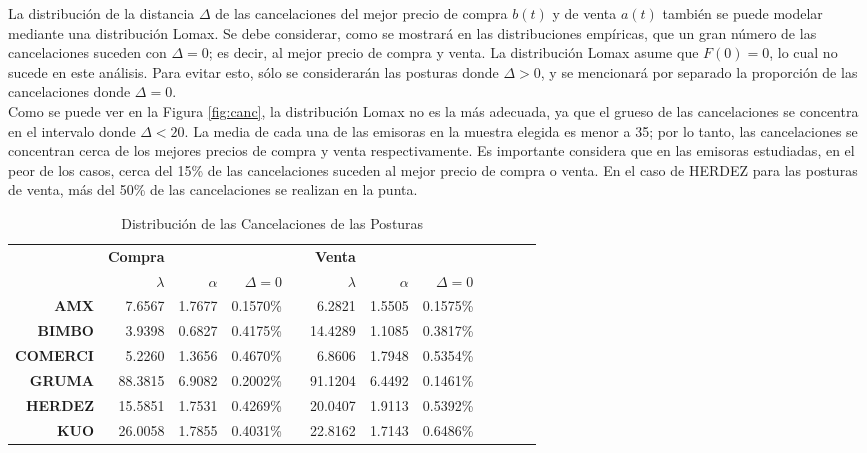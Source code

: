 \documentclass[11pt]{article}
\numberwithin{equation}{section} %
\begin{document}
La distribución de la distancia $\Delta$ de las cancelaciones del mejor precio de compra $b(t)$ y de venta $a(t)$ también se puede modelar mediante una distribución Lomax. Se debe considerar, como se mostrará en las distribuciones empíricas, que un gran número de las cancelaciones suceden con $\Delta=0$; es decir, al mejor precio de compra y venta. La distribución Lomax asume que $F(0)=0$, lo cual no sucede en este análisis. Para evitar esto, sólo se considerarán las posturas donde $\Delta>0$, y se mencionará por separado la proporción de las cancelaciones donde $\Delta=0$.\\

Como se puede ver en la Figura \ref{fig:canc}, la distribución Lomax no es la más adecuada, ya que el grueso de las cancelaciones se concentra en el intervalo donde $\Delta<20$. La media de cada una de las emisoras en la muestra elegida es menor a 35; por lo tanto, las cancelaciones se concentran cerca de los mejores precios de compra y venta respectivamente. Es importante considera que en las emisoras estudiadas, en el peor de los casos, cerca del 15\% de las cancelaciones suceden al mejor precio de compra o venta. En el caso de HERDEZ para las posturas de venta, más del 50\% de las cancelaciones se realizan en la punta.

\begin{table}[htbp]
\centering
\caption{Distribución de las Cancelaciones de las Posturas}
\begin{tabular}{r|r|r|r|r|r|r|r|r|r|r|r|}
\multicolumn{1}{r}{} & \multicolumn{1}{r}{\textbf{Compra}} & \multicolumn{1}{r}{} & \multicolumn{1}{r}{} & \multicolumn{1}{r}{} & \multicolumn{1}{r}{\textbf{Venta}} & \multicolumn{1}{r}{} \\
\cline{2-4}
\cline{6-8}
& $\lambda$ & $\alpha$ & $\Delta=0$ & & $\lambda$ & $\alpha$ & $\Delta=0$ \\
\cline{2-4}
\cline{6-8}
\textbf{AMX}   & 7.6567 & 1.7677 & 0.1570\% & & 6.2821 & 1.5505 & 0.1575\% \\
\textbf{BIMBO} & 3.9398 & 0.6827 & 0.4175\% & & 14.4289 & 1.1085 & 0.3817\% \\
\textbf{COMERCI}   & 5.2260 & 1.3656 & 0.4670\% & & 6.8606 & 1.7948 & 0.5354\% \\
\textbf{GRUMA} & 88.3815 & 6.9082 & 0.2002\% & & 91.1204 & 6.4492 & 0.1461\% \\
\textbf{HERDEZ}   & 15.5851 & 1.7531 & 0.4269\% & & 20.0407 & 1.9113 & 0.5392\% \\
\textbf{KUO}   & 26.0058 & 1.7855 & 0.4031\% & & 22.8162 & 1.7143 & 0.6486\% \\
\cline{2-4}
\cline{6-8}
\end{tabular}%
\label{tab:powercanc}%
\end{table}%
\end{document}
